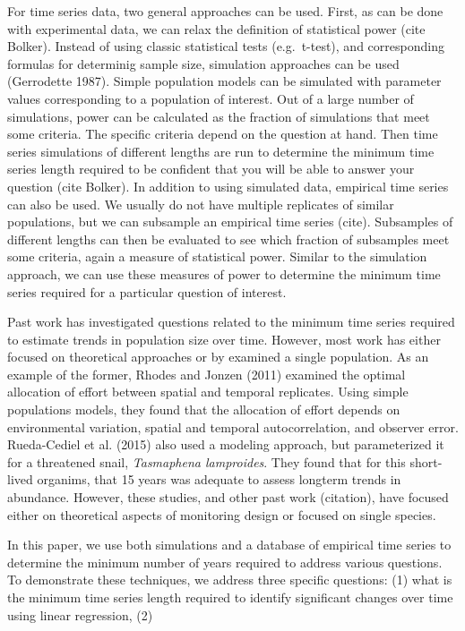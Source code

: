 \documentclass[12pt,]{article}
\begin{document}
For time series data, two general approaches can be used. First, as can
be done with experimental data, we can relax the definition of
statistical power (cite Bolker). Instead of using classic statistical
tests (e.g.~t-test), and corresponding formulas for determinig sample
size, simulation approaches can be used (Gerrodette 1987). Simple
population models can be simulated with parameter values corresponding
to a population of interest. Out of a large number of simulations, power
can be calculated as the fraction of simulations that meet some
criteria. The specific criteria depend on the question at hand. Then
time series simulations of different lengths are run to determine the
minimum time series length required to be confident that you will be
able to answer your question (cite Bolker). In addition to using
simulated data, empirical time series can also be used. We usually do
not have multiple replicates of similar populations, but we can
subsample an empirical time series (cite). Subsamples of different
lengths can then be evaluated to see which fraction of subsamples meet
some criteria, again a measure of statistical power. Similar to the
simulation approach, we can use these measures of power to determine the
minimum time series required for a particular question of interest.

Past work has investigated questions related to the minimum time series
required to estimate trends in population size over time. However, most
work has either focused on theoretical approaches or by examined a
single population. As an example of the former, Rhodes and Jonzen (2011)
examined the optimal allocation of effort between spatial and temporal
replicates. Using simple populations models, they found that the
allocation of effort depends on environmental variation, spatial and
temporal autocorrelation, and observer error. Rueda-Cediel et al. (2015)
also used a modeling approach, but parameterized it for a threatened
snail, \emph{Tasmaphena lamproides}. They found that for this
short-lived organims, that 15 years was adequate to assess longterm
trends in abundance. However, these studies, and other past work
(citation), have focused either on theoretical aspects of monitoring
design or focused on single species.

In this paper, we use both simulations and a database of empirical time
series to determine the minimum number of years required to address
various questions. To demonstrate these techniques, we address three
specific questions: (1) what is the minimum time series length required
to identify significant changes over time using linear regression, (2)
\end{document}
